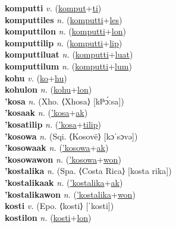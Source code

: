\textbf{komputti} \textit{v.} (\hyperref[komput]{komput}+\hyperref[ti]{ti})
 \label{komputti} \\
\textbf{komputtiles} \textit{n.} (\hyperref[komputti]{komputti}+\hyperref[les]{les})
 \label{komputtiles} \\
\textbf{komputtilon} \textit{n.} (\hyperref[komputti]{komputti}+\hyperref[lon]{lon})
 \label{komputtilon} \\
\textbf{komputtilip} \textit{n.} (\hyperref[komputti]{komputti}+\hyperref[lip]{lip})
 \label{komputtilip} \\
\textbf{komputtiluat} \textit{n.} (\hyperref[komputti]{komputti}+\hyperref[luat]{luat})
 \label{komputtiluat} \\
\textbf{komputtilum} \textit{n.} (\hyperref[komputti]{komputti}+\hyperref[lum]{lum})
 \label{komputtilum} \\
\textbf{kohu} \textit{v.} (\hyperref[ko]{ko}+\hyperref[hu]{hu})
 \label{kohu} \\
\textbf{kohulon} \textit{n.} (\hyperref[kohu]{kohu}+\hyperref[lon]{lon})
 \label{kohulon} \\
\textbf{'kosa} \textit{n.} (Xho. ⟨Xhosa⟩ [kǁʰɔ́ːsa])
 \label{'kosa} \\
\textbf{'kosaak} \textit{n.} (\hyperref['kosa]{'kosa}+\hyperref[ak]{ak})
 \label{'kosaak} \\
\textbf{'kosatilip} \textit{n.} (\hyperref['kosa]{'kosa}+\hyperref[tilip]{tilip})
 \label{'kosatilip} \\
\textbf{'kosowa} \textit{n.} (Sqi. ⟨Kosovë⟩ [kɔˈsɔvə])
 \label{'kosowa} \\
\textbf{'kosowaak} \textit{n.} (\hyperref['kosowa]{'kosowa}+\hyperref[ak]{ak})
 \label{'kosowaak} \\
\textbf{'kosowawon} \textit{n.} (\hyperref['kosowa]{'kosowa}+\hyperref[won]{won})
 \label{'kosowawon} \\
\textbf{'kostalika} \textit{n.} (Spa. ⟨Costa Rica⟩ [kosta rika])
 \label{'kostalika} \\
\textbf{'kostalikaak} \textit{n.} (\hyperref['kostalika]{'kostalika}+\hyperref[ak]{ak})
 \label{'kostalikaak} \\
\textbf{'kostalikawon} \textit{n.} (\hyperref['kostalika]{'kostalika}+\hyperref[won]{won})
 \label{'kostalikawon} \\
\textbf{kosti} \textit{v.} (Epo. ⟨kosti⟩ [ˈkosti])
 \label{kosti} \\
\textbf{kostilon} \textit{n.} (\hyperref[kosti]{kosti}+\hyperref[lon]{lon})
 \label{kostilon} \\

